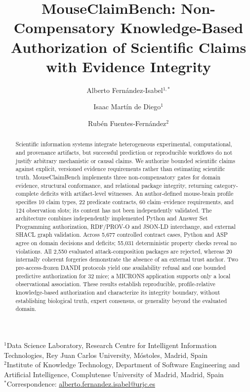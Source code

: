 \documentclass[11pt,a4paper]{article}
\begin{document}
\title{MouseClaimBench: Non-Compensatory Knowledge-Based Authorization of Scientific Claims with Evidence Integrity}
\author{Alberto Fern\'andez-Isabel$^{1,\ast}$ \and Isaac Mart\'in de Diego$^1$ \and Rub\'en Fuentes-Fern\'andez$^2$}
\date{}
\maketitle
\begin{center}
\small
$^1$Data Science Laboratory, Research Centre for Intelligent Information Technologies, Rey Juan Carlos University, M\'ostoles, Madrid, Spain\\
$^2$Institute of Knowledge Technology, Department of Software Engineering and Artificial Intelligence, Complutense University of Madrid, Madrid, Spain\\
$^{\ast}$Correspondence: \href{mailto:alberto.fernandez.isabel@urjc.es}{alberto.fernandez.isabel@urjc.es}
\end{center}
\vspace{1ex}
\begin{abstract}
Scientific information systems integrate heterogeneous experimental, computational, and provenance artifacts, but successful prediction or reproducible workflows do not justify arbitrary mechanistic or causal claims. We authorize bounded scientific claims against explicit, versioned evidence requirements rather than estimating scientific truth. MouseClaimBench implements three non-compensatory gates for domain evidence, structural conformance, and relational package integrity, returning category-complete deficits with artifact-level witnesses. An author-defined mouse-brain profile specifies 10 claim types, 22 predicate contracts, 60 claim--evidence requirements, and 124 observation slots; its content has not been independently validated. The architecture combines independently implemented Python and Answer Set Programming authorization, RDF/PROV-O and JSON-LD interchange, and external SHACL graph validation. Across 5,677 controlled contract cases, Python and ASP agree on domain decisions and deficits; 55,031 deterministic property checks reveal no violations. All 2,550 evaluated attack-composition packages are rejected, whereas 20 internally coherent forgeries demonstrate the absence of an external trust anchor. Two pre-access-frozen DANDI protocols yield one availability refusal and one bounded predictive authorization for 32 mice; a MICRONS application supports only a local observational association. These results establish reproducible, profile-relative knowledge-based authorization and characterize its integrity boundary, without establishing biological truth, expert consensus, or generality beyond the evaluated domain.
\end{abstract}
\end{document}
